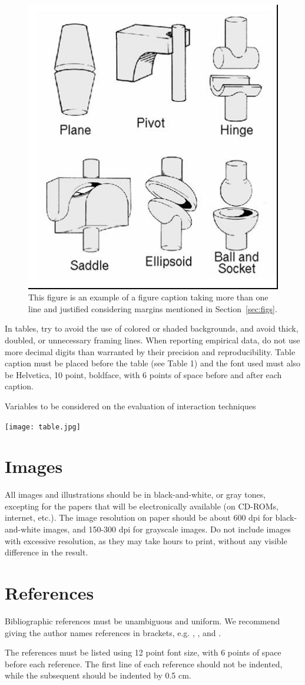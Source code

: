 \documentclass[12pt]{article}
\begin{document}
\begin{figure}[ht]
  \centering
  \includegraphics[width=.3\textwidth]{assets/fig2.jpg}
  \caption{This figure is an example of a figure caption taking more than one
    line and justified considering margins mentioned in Section~\ref{sec:figs}.}
  \label{fig:exampleFig2}
\end{figure}

In tables, try to avoid the use of colored or shaded backgrounds, and avoid
thick, doubled, or unnecessary framing lines. When reporting empirical data,
do not use more decimal digits than warranted by their precision and
reproducibility. Table caption must be placed before the table (see Table 1)
and the font used must also be Helvetica, 10 point, boldface, with 6 points of
space before and after each caption.

\begin{table}[ht]
  \centering
  \caption{Variables to be considered on the evaluation of interaction
    techniques}
  \label{tab:exTable1}
  \texttt{[image: table.jpg]}
\end{table}

\section{Images}

All images and illustrations should be in black-and-white, or gray tones,
excepting for the papers that will be electronically available (on CD-ROMs,
internet, etc.). The image resolution on paper should be about 600 dpi for
black-and-white images, and 150-300 dpi for grayscale images.  Do not include
images with excessive resolution, as they may take hours to print, without any
visible difference in the result.

\section{References}

Bibliographic references must be unambiguous and uniform.  We recommend giving
the author names references in brackets, e.g. \cite{knuth:84},
\cite{boulic:91}, and \cite{smith:99}.

The references must be listed using 12 point font size, with 6 points of space
before each reference. The first line of each reference should not be
indented, while the subsequent should be indented by 0.5 cm.



\end{document}
